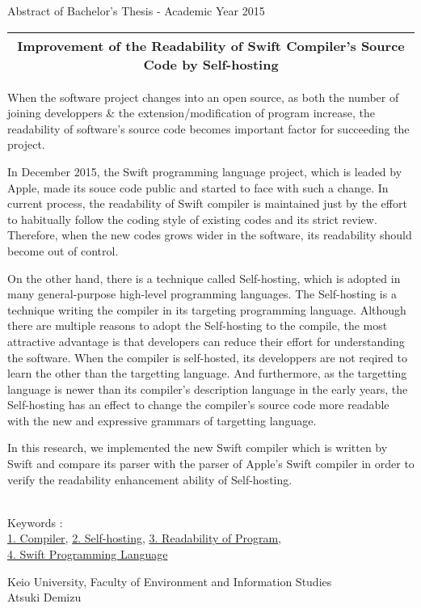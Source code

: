 Abstract of Bachelor's Thesis - Academic Year 2015
\begin{center}
\begin{Large}
\begin{tabular}{|c|} \hline
Improvement of the Readability of Swift Compiler's Source Code by Self-hosting
\\
\hline
\end{tabular}
\end{Large}
\end{center}

When the software project changes into an open source, as both the number of joining developpers \& the extension/modification of program increase, the readability of software's source code becomes important factor for succeeding the project.

In December 2015, the Swift programming language project, which is leaded by Apple, made its souce code public and started to face with such a change.
In current process, the readability of Swift compiler is maintained just by the effort to habitually follow the coding style of existing codes and its strict review.
Therefore, when the new codes grows wider in the software, its readability should become out of control.

On the other hand, there is a technique called Self-hosting, which is adopted in many general-purpose high-level programming languages.
The Self-hosting is a technique writing the compiler in its targeting programming language.
Although there are multiple reasons to adopt the Self-hosting to the compile, the most attractive advantage is that developers can reduce their effort for understanding the software.
When the compiler is self-hosted, its developpers are not reqired to learn the other than the targetting language.
And furthermore, as the targetting language is newer than its compiler's description language in the early years, the Self-hosting has an effect to change the compiler's source code more readable with the new and expressive grammars of targetting language.

In this research, we implemented the new Swift compiler which is written by Swift and compare its parser with the parser of Apple's Swift compiler in order to verify the readability enhancement ability of Self-hosting.

~ \\
Keywords : \\
\underline{1. Compiler},
\underline{2. Self-hosting},
\underline{3. Readability of Program},\\
\underline{4. Swift Programming Language}
\begin{flushright}
Keio University, Faculty of Environment and Information Studies\\
Atsuki Demizu
\end{flushright}
